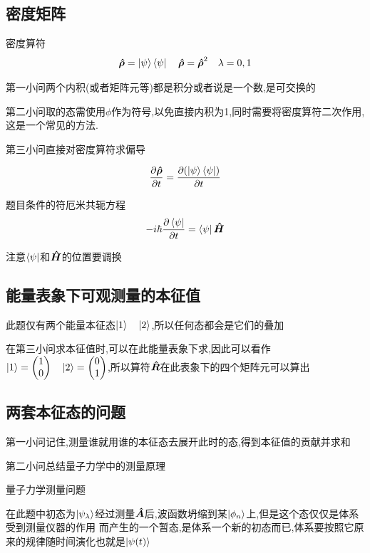        \subsection{密度矩阵}

        \begin{formal}
            密度算符
            $$ \vu*{\rho} = \ket{\psi} \bra{\psi} \quad \vu*{\rho} =  \vu*{\rho}^{2} \quad \lambda = 0,1$$
        \end{formal}
            第一小问两个内积(或者矩阵元等)都是积分或者说是一个数,是可交换的
            
            第二小问取的态需使用$\phi$作为符号,以免直接内积为1,同时需要将密度算符二次作用,这是一个常见的方法.

            第三小问直接对密度算符求偏导

            $$ \pdv{\vu*{\rho}}{t} = \pdv{(\ket{\psi} \bra{\psi})}{t} $$

            题目条件的符厄米共轭方程
            $$ -i\hbar \pdv{\bra{\psi}}{t} = \bra{\psi} \vu*{H}  $$

            注意$\bra{\psi}$和$\vu*{H}$的位置要调换
        \subsection{能量表象下可观测量的本征值}
            此题仅有两个能量本征态$\ket{1} \quad \ket{2}$,所以任何态都会是它们的叠加

            在第三小问求本征值时,可以在此能量表象下求,因此可以看作$\ket{1} = \mqty(1 \\ 0) \quad \ket{2} = \mqty(0 \\ 1)$,所以算符$\vu*{R}$在此表象下的四个矩阵元可以算出

        \subsection{两套本征态的问题}
            第一小问记住,测量谁就用谁的本征态去展开此时的态,得到本征值的贡献并求和

            第二小问总结量子力学中的测量原理
            \begin{formal}
                
                量子力学测量问题

                在此题中初态为$\ket{\psi_{\lambda}}$经过测量$\vu*{A}$后,波函数坍缩到某$\ket{\phi_{n}}$上,但是这个态仅仅是体系受到测量仪器的作用
                而产生的一个暂态,是体系一个新的初态而已,体系要按照它原来的规律随时间演化也就是$\ket{\psi(t)}$
            \end{formal}


